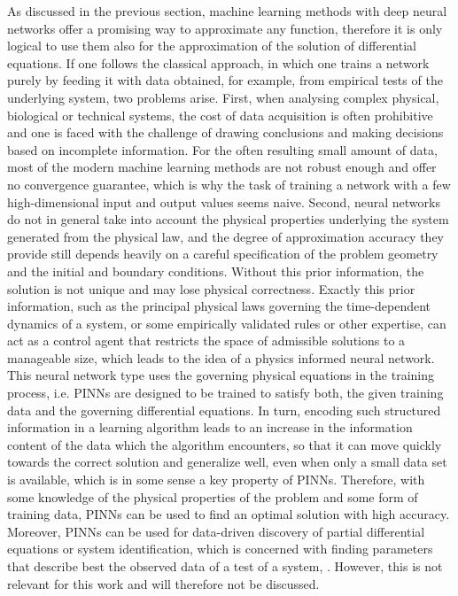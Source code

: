 As discussed in the previous section, machine learning methods with deep neural networks offer a promising way to approximate any function, therefore it is only logical to use them also for the approximation of the solution of differential equations. If one follows the classical approach, in which one trains a network purely by feeding it with data obtained, for example, from empirical tests of the underlying system, two problems arise. First, when analysing complex physical, biological or technical systems, the cost of data acquisition is often prohibitive and one is faced with the challenge of drawing conclusions and making decisions based on incomplete information. For the often resulting small amount of data, most of the modern machine learning methods are not robust enough and offer no convergence guarantee, which is why the task of training a network with a few high-dimensional input and output values seems naive. Second, neural networks do not in general take into account the physical properties underlying the system generated from the physical law, and the degree of approximation accuracy they provide still depends heavily on a careful specification of the problem geometry and the initial and boundary conditions. Without this prior information, the solution is not unique and may lose physical correctness. Exactly this prior information, such as the principal physical laws governing the time-dependent dynamics of a system, or some empirically validated rules or other expertise, can act as a control agent that restricts the space of admissible solutions to a manageable size, which leads to the idea of a physics informed neural network. This neural network type uses the governing physical equations in the training process, i.e. PINNs are designed to be trained to satisfy both, the given training data and the governing differential equations. In turn, encoding such structured information in a learning algorithm leads to an increase in the information content of the data which the algorithm encounters, so that it can move quickly towards the correct solution and generalize well, even when only a small data set is available, which is in some sense a key property of PINNs. Therefore, with some knowledge of the physical properties of the problem and some form of training data, PINNs can be used to find an optimal solution with high accuracy. Moreover, PINNs can be used for data-driven discovery of partial differential equations or system identification, which is concerned with finding parameters that describe best the observed data of a test of a system, \cite[pp.~1-2]{RaissiPerdikarisKarniadakisPart1:2017}. However, this is not relevant for this work and will therefore not be discussed. \\

